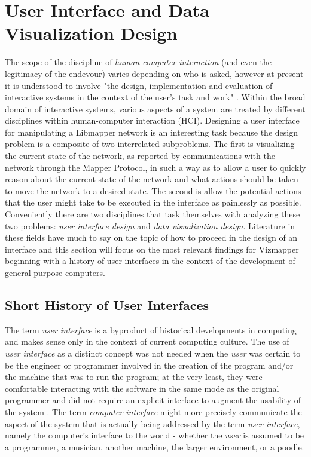 \resetdatestamp

\chapter{User Interface and Data Visualization Design}

The scope of the discipline of \emph{human-computer interaction} (and even the legitimacy of the endevour) varies depending on who is asked, however at present it is understood to involve "the design, implementation and evaluation of interactive systems in the context of the user's task and work" \cite{hci1998}. Within the broad domain of interactive systems, various aspects of a system are treated by different disciplines within human-computer interaction (HCI). Designing a user interface for manipulating a Libmapper network is an interesting task because the design problem is a composite of two interrelated subproblems. The first is visualizing the current state of the network, as reported by communications with the network through the Mapper Protocol, in such a way as to allow a user to quickly reason about the current state of the network and what actions should be taken to move the network to a desired state. The second is allow the potential actions that the user might take to be executed in the interface as painlessly as possible. Conveniently there are two disciplines that task themselves with analyzing these two problems: \emph{user interface design} and \emph{data visualization design}. Literature in these fields have much to say on the topic of how to proceed in the design of an interface and this section will focus on the most relevant findings for Vizmapper beginning with a history of user interfaces in the context of the development of general purpose computers.

\section{Short History of User Interfaces}

The term \emph{user interface} is a byproduct of historical developments in computing and makes sense only in the context of current computing culture. The use of \emph{user interface} as a distinct concept was not needed when the \emph{user} was certain to be the engineer or programmer involved in the creation of the program and/or the machine that was to run the program; at the very least, they were comfortable interacting with the software in the same mode as the original programmer and did not require an explicit interface to augment the usability of the system \cite{continuity1990}. The term \emph{computer interface} might more precisely communicate the aspect of the system that is actually being addressed by the term \emph{user interface}, namely the computer's interface to the world - whether the \emph{user} is assumed to be a programmer, a musician, another machine, the larger environment, or a poodle. 


